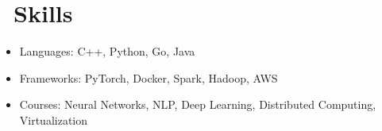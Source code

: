 \documentclass{resume}
\begin{document}
\section{\faCogs\ Skills}
\begin{itemize}[parsep=0.5ex]
  \item Languages: C++, Python, Go, Java
  \item Frameworks: PyTorch, Docker, Spark, Hadoop, AWS
  \item Courses: Neural Networks, NLP, Deep Learning, Distributed Computing, Virtualization
\end{itemize}

%
\end{document}
